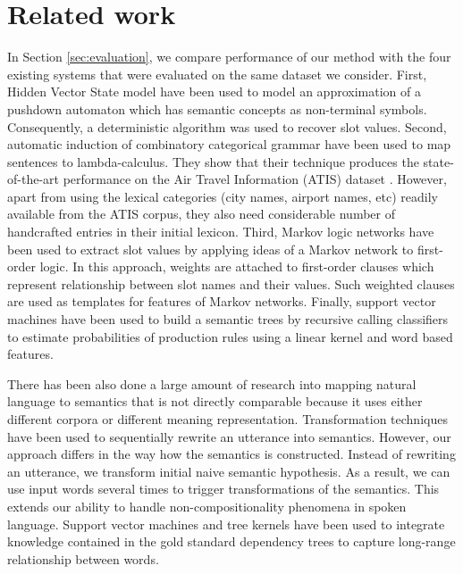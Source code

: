 \documentclass{article}
\begin{document}
\section{Related work}

In Section \ref{sec:evaluation}, we compare performance of our method with the four existing systems that were evaluated on the same dataset we consider. 
First, Hidden Vector State model \cite{he05,jurcicek08} have been used to model an approximation of a pushdown automaton which has semantic concepts as non-terminal symbols. Consequently, a deterministic algorithm was used to recover slot values.
Second, automatic induction of combinatory categorical grammar \cite{zettlemoyer07} have been used to map sentences to lambda-calculus. 
They show that their technique produces the state-of-the-art performance on the Air Travel Information (ATIS) dataset \cite{atis94}. However, apart from using the lexical categories (city names, airport names, etc) readily available from the ATIS corpus, they also need considerable number of handcrafted entries in their initial lexicon. 
Third, Markov logic networks \cite{meza08b} have been used to extract slot values by applying ideas of a Markov network to first-order logic. In this approach, weights are attached to first-order clauses which represent relationship between slot names and their values. Such weighted clauses are used as templates for features of Markov networks.
Finally, support vector machines \cite{mairesse09} have been used to build a semantic trees by recursive calling classifiers to estimate probabilities of production rules using a linear kernel and word based features.

There has been also done a large amount of research into mapping natural language to semantics that is not directly comparable because it uses either different corpora or different meaning representation. 
Transformation techniques \cite{kate05} have been used to sequentially rewrite an utterance into semantics. However, our approach differs in the way how the semantics is constructed. Instead of rewriting an utterance, we transform initial naive semantic hypothesis. As a result, we can use input words several times to trigger transformations of the semantics. This extends our ability to handle non-compositionality phenomena in spoken language.
Support vector machines and tree kernels \cite{kate08} have been used to integrate knowledge contained in the gold standard dependency trees to capture long-range relationship between words. 
\end{document}
